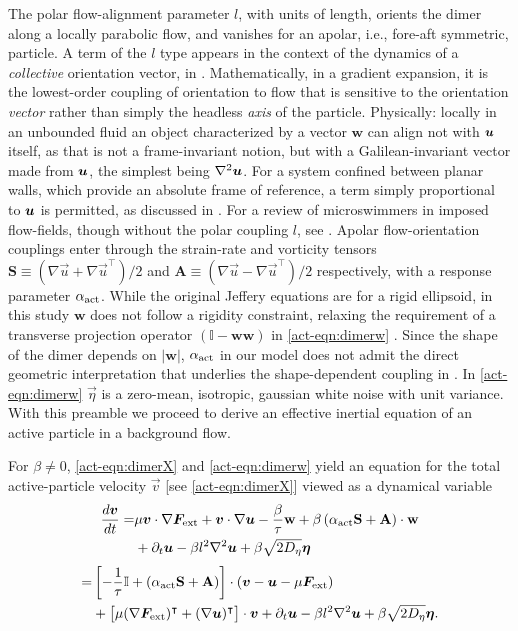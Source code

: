 \documentclass[../Rajarshi-thesis-draft.tex]{subfiles}
\begin{document}
The polar flow-alignment parameter $l$, with units of length, orients the dimer along a locally parabolic flow, and vanishes for an apolar, i.e., fore-aft symmetric, particle. A term of the $l$ type appears in the context of the dynamics of a \textit{collective} orientation vector, in \cite{maitra2014activating}. Mathematically, in a gradient expansion, it is the lowest-order coupling of orientation to flow that is sensitive to the orientation \textit{vector} rather than simply the headless \textit{axis} of the particle. Physically: locally in an unbounded fluid an object characterized by a vector $\mathbf{w}$ can align not with $\vect{u}$ itself, as that is not a frame-invariant notion, but with a Galilean-invariant vector made from $\vect{u}$, the simplest being $\nabla^2\vect{u}$. For a system confined between planar walls, which provide an absolute frame of reference, a term simply proportional to $\vect{u}$ is permitted, as discussed in \cite{shimoyama1996collective,brotto2013hydrodynamics,kumar2014flocking}.  
For a review of microswimmers in imposed flow-fields, though without the polar coupling $l$, see \cite{Stark2016}.  Apolar flow-orientation couplings \cite{Jeffery1922} enter through the strain-rate and vorticity tensors $\mathbf{S}\equiv (\nabla \vec{u} + \nabla \vec{u}^\top)/2$ and $\mathbf{A} \equiv (\nabla \vec{u} - \nabla \vec{u}^\top)/2$ respectively, with a response parameter $\alpha_{\rm act}$. While the original Jeffery equations are for a rigid ellipsoid, in this study $\mathbf{w}$ does not follow a rigidity constraint, relaxing the requirement of a transverse projection operator $(\mathbb{I} - \mathbf{ww})$ \cite{Jeffery1922} in \eqref{act-eqn:dimerw} . Since the shape of the dimer depends on $|\mathbf{w}|$, $\alpha_{\rm act}$ in our model does not admit the direct geometric interpretation that underlies the shape-dependent coupling in \cite{Jeffery1922}. In \eqref{act-eqn:dimerw} $\vec{\eta}$ is a zero-mean, isotropic, gaussian white noise with unit variance. With this preamble we proceed to derive an effective inertial equation of an active particle in a background flow.

 For $\beta \neq 0$, \eqref{act-eqn:dimerX} and \eqref{act-eqn:dimerw} yield an equation for the total active-particle velocity $\vec{v}$ [see \eqref{act-eqn:dimerX}] viewed as a dynamical variable
\begin{align*}
\frac{d \vec{v}}{dt}  = & \mu \vec{v} \cdot \nabla \vec{F}_{\rm ext} + \vec{v} \cdot \nabla \vec{u} -\frac{\beta}{\tau} \mathbf{w} + \beta \left( \alpha_{\rm act} \mathbf{S} + \mathbf{A}\right) \cdot \mathbf{w} \\ \nonumber & +  \partial_{t}\vec{u} - \beta l^{2} \nabla ^{2} \vec{u} + \beta \sqrt{2D_\eta} \vec{\eta}
\end{align*}
\begin{align*}
 = & \left[ - \frac{1}{\tau} \mathbb{I} + (\alpha_{\rm act} \mathbf{S} + \mathbf{A})\right] \cdot (\vec{v} - \vec{u} - \mu \vec{F}_{\rm ext}) \\ \nonumber
 & + \left[ \mu (\nabla \vec{F}_{\rm ext})^{\intercal}  + (\nabla \vec{u})^{\intercal}\right] \cdot \vec{v} + \partial_{t} \vec{u} - \beta l^{2} \nabla^{2} \vec{u} + \beta \sqrt{2D_\eta} \vec{\eta}.
\end{align*}
\end{document}
